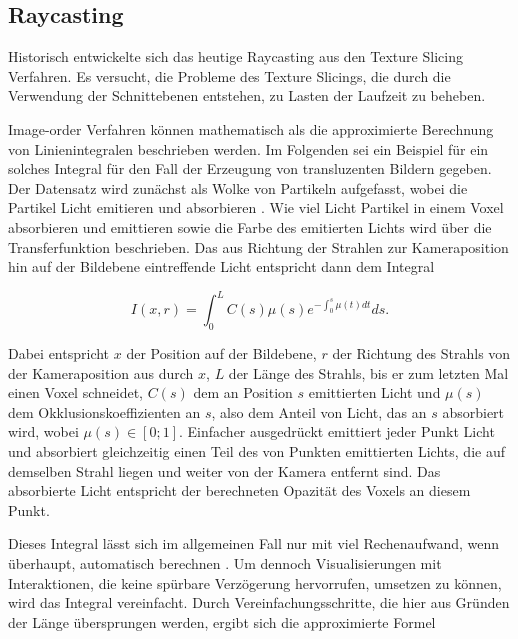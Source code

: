 \documentclass[a4paper,fontsize=12pt,toc=bib,parskip=half,ngerman]{scrartcl}
\begin{document}
\subsection{Raycasting}
\label{sec:Raycasting}

Historisch entwickelte sich das heutige Raycasting aus den Texture Slicing Verfahren. Es versucht, die Probleme des Texture Slicings, die durch die Verwendung der Schnittebenen entstehen, zu Lasten der Laufzeit zu beheben.

Image-order Verfahren k\"onnen mathematisch als die approximierte Berechnung von Linienintegralen beschrieben werden. Im Folgenden sei ein Beispiel f\"ur ein solches Integral f\"ur den Fall der Erzeugung von transluzenten Bildern gegeben.
Der Datensatz wird zun\"achst als Wolke von Partikeln aufgefasst, wobei die Partikel Licht emitieren und absorbieren \cite[s.~134~f.]{hansen2005visualization}. Wie viel Licht Partikel in einem Voxel absorbieren und emittieren sowie die Farbe des emitierten Lichts wird \"uber die Transferfunktion beschrieben. Das aus Richtung der Strahlen zur Kameraposition hin auf der Bildebene eintreffende Licht entspricht dann dem Integral 

\begin{equation}
I(x,r) = \int_{0}^{L} C(s)\mu(s) e^{-\int_{0}^{s}\mu(t)dt}ds.
\end{equation}

Dabei entspricht $x$ der Position auf der Bildebene, $r$ der Richtung des Strahls von der Kameraposition aus durch $x$, $L$ der L\"ange des Strahls, bis er zum letzten Mal einen Voxel schneidet, $C(s)$ dem an Position $s$ emittierten Licht und $\mu(s)$ dem Okklusionskoeffizienten an $s$, also dem Anteil von Licht, das an $s$ absorbiert wird, wobei $\mu(s) \in [0;1]$. Einfacher ausgedr\"uckt emittiert jeder Punkt Licht und absorbiert gleichzeitig einen Teil des von Punkten emittierten Lichts, die auf demselben Strahl liegen und weiter von der Kamera entfernt sind. Das absorbierte Licht entspricht der berechneten Opazit\"at des Voxels an diesem Punkt.

Dieses Integral l\"asst sich im allgemeinen Fall nur mit viel Rechenaufwand, wenn \"uberhaupt, automatisch berechnen \cite[S.~136]{hansen2005visualization}. Um dennoch Visualisierungen mit Interaktionen, die keine sp\"urbare Verz\"ogerung hervorrufen, umsetzen zu k\"onnen, wird das Integral vereinfacht. Durch Vereinfachungsschritte, die hier aus Gr\"unden der L\"ange \"ubersprungen werden, ergibt sich die approximierte Formel
\end{document}
